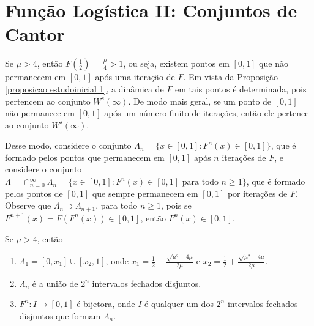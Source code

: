 
\section{Função Logística II: Conjuntos de Cantor}


Se $\mu > 4$, então $F\left(\frac{1}{2}\right)$ = $\frac{\mu}{4} > 1$, ou seja, existem pontos em $[0, 1]$ que não permanecem em $[0, 1]$ após uma iteração de $F$. Em vista da Proposição \ref{proposicao estudoinicial 1}, a dinâmica de $F$ em tais pontos é determinada, pois pertencem ao conjunto $W^s(\infty)$. De modo mais geral, se um ponto de $[0, 1]$ não permanece em $[0, 1]$ após um número finito de iterações, então ele pertence ao conjunto $W^s(\infty)$. 

Desse modo, considere o conjunto $\Lambda_n = \{x \in [0, 1] : F^n(x) \in [0, 1]\}$, que é formado pelos pontos que permanecem em $[0, 1]$ após $n$ iterações de $F$, e considere o conjunto $\Lambda = \cap_{n=0}^{\infty} \Lambda_n = \{x \in [0, 1] : F^n(x) \in [0, 1] \textrm{ para todo } n \geq 1\}$, que é formado pelos pontos de $[0, 1]$ que sempre permanecem em $[0, 1]$ por iterações de $F$. Observe que $\Lambda_n \supset \Lambda_{n+1}$, para todo $n \geq 1$, pois se $F^{n+1}(x) = F(F^n(x)) \in [0,1]$, então $F^n(x) \in [0,1]$.


\begin{proposition}
\label{proposicao conjuntosdecantor 1}
Se $\mu > 4$, então
\begin{enumerate}
\item $\Lambda_1 = [0, x_1] \cup [x_2, 1]$, onde $x_1 = \frac{1}{2} - \frac{\sqrt{\mu^2 - 4\mu}}{2\mu}$ e $x_2 = \frac{1}{2} + \frac{\sqrt{\mu^2 - 4\mu}}{2\mu}$.
\item $\Lambda_n$ é a união de $2^n$ intervalos fechados disjuntos.
\item $F^n: I \to [0, 1]$ é bijetora, onde $I$ é qualquer um dos $2^n$ intervalos fechados disjuntos que formam $\Lambda_n$.
\end{enumerate}
\end{proposition}

